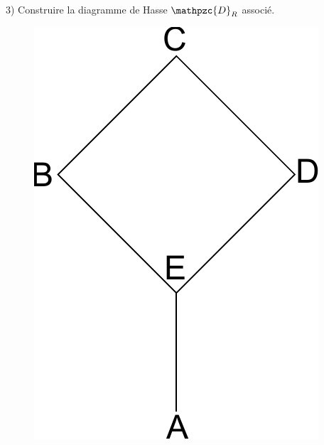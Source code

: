 \documentclass[a4paper,12pt]{article}
\begin{document}
3) Construire la diagramme de Hasse $\mathpzc{D}_R$ associé.

\begin{figure}[hr!]
  \centering
    \includegraphics[width=.15\linewidth]{./exo2-hasse.pdf}
\end{figure}

\end{document}
